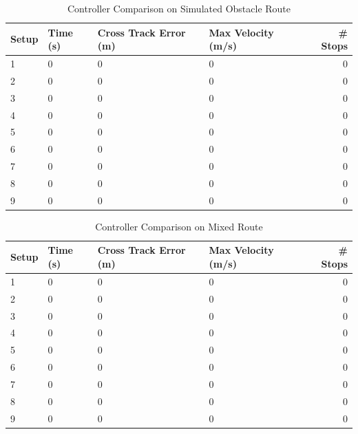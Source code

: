\begin{table}[ht!]
\caption{Controller Comparison on Simulated Obstacle Route}
\small
\centering
\begin{tabular}{@{}llllr@{}} \toprule
Setup & Time (s) & Cross Track Error (m) & Max Velocity (m/s) & \# Stops \\ \midrule
1     & 0        & 0                     & 0                  & 0        \\
2     & 0        & 0                     & 0                  & 0        \\
3     & 0        & 0                     & 0                  & 0        \\
4     & 0        & 0                     & 0                  & 0        \\
5     & 0        & 0                     & 0                  & 0        \\
6     & 0        & 0                     & 0                  & 0        \\
7     & 0        & 0                     & 0                  & 0        \\
8     & 0        & 0                     & 0                  & 0        \\
9     & 0        & 0                     & 0                  & 0        \\ \bottomrule
\end{tabular}
\label{tab:resultsControllersObstacles}
\end{table}

\begin{table}[ht!]
\caption{Controller Comparison on Mixed Route}
\small
\centering
\begin{tabular}{@{}llllr@{}} \toprule
Setup & Time (s) & Cross Track Error (m) & Max Velocity (m/s) & \# Stops \\ \midrule
1     & 0        & 0                     & 0                  & 0        \\
2     & 0        & 0                     & 0                  & 0        \\
3     & 0        & 0                     & 0                  & 0        \\
4     & 0        & 0                     & 0                  & 0        \\
5     & 0        & 0                     & 0                  & 0        \\
6     & 0        & 0                     & 0                  & 0        \\
7     & 0        & 0                     & 0                  & 0        \\
8     & 0        & 0                     & 0                  & 0        \\
9     & 0        & 0                     & 0                  & 0        \\ \bottomrule
\end{tabular}
\label{tab:resultsControllersMixed}
\end{table}

